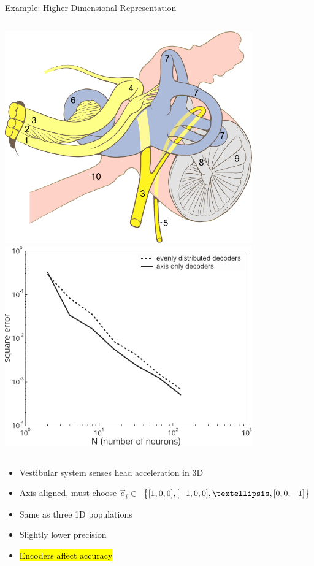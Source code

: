 \documentclass[handout,aspectratio=169]{beamer}
\begin{document}
\begin{frame}{Example: Higher Dimensional Representation}
	\begin{columns}[b]
		\centering
		\includegraphics[width=0.8\textwidth]{media/ear_internal_anatomy_numbered.pdf}
		\centering
		\includegraphics[width=0.8\textwidth]{media/eliasmith_et_al_2003_axis_aligned.pdf}%
	\end{columns}
	\begin{multicols}{2}
		\begin{itemize}
			\item Vestibular system senses head acceleration in 3D
			\item Axis aligned, must choose $\vec e_i \in$
			$\big\{ [1, 0, 0], [-1, 0, 0], \textellipsis, [0, 0, -1] \big\}$
			\columnbreak
			\item Same as three 1D populations
			\item Slightly lower precision
			\item<2-> \hl{Encoders affect accuracy}
		\end{itemize}
	\end{multicols}
\end{frame}
\end{document}
